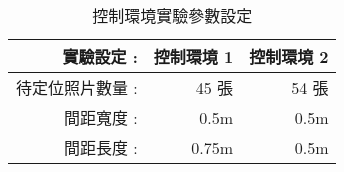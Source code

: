 \begin{table}[htbp]
  \centering
  \caption{控制環境實驗參數設定}
    \begin{tabular}{rrr}
    \toprule
    實驗設定 :  & 控制環境 1 & 控制環境 2 \\
    \midrule
    待定位照片數量 : & 45 張  & 54 張 \\
    間距寬度 : & 0.5m & 0.5m \\
    間距長度 : & 0.75m & 0.5m \\
    \bottomrule
    \end{tabular}%
  \label{table:Controlled EV parameters}%
\end{table}%
